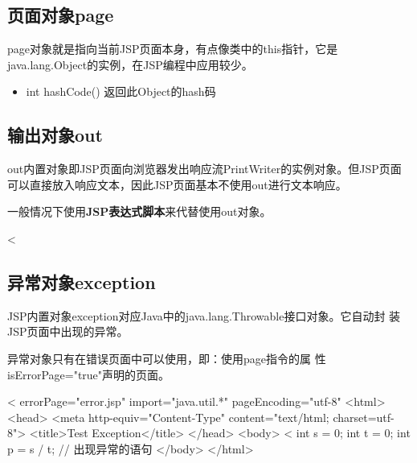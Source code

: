 \subsection{页面对象page} 

page对象就是指向当前JSP页面本身，有点像类中的this指针，它是java.lang.Object的实例，在JSP编程中应用较少。


\begin{itemize}
\item int hashCode() 返回此Object的hash码
\end{itemize}


\subsection{输出对象out}

out内置对象即JSP页面向浏览器发出响应流PrintWriter的实例对象。但JSP页面
可以直接放入响应文本，因此JSP页面基本不使用out进行文本响应。

一般情况下使用{\bf\Red JSP表达式脚本}来代替使用out对象。

\begin{jspCode}
  <%
\end{jspCode}

\subsection{异常对象exception} 

JSP内置对象exception对应Java中的java.lang.Throwable接口对象。它自动封
装JSP页面中出现的异常。

异常对象只有在{\hei\Blue 错误页面}中可以使用，即：{\kai\Red 使用page指令的属
  性{\Blue isErrorPage="true"}声明的页面。}


\begin{jspCode}
  <%
    errorPage="error.jsp" import="java.util.*" pageEncoding="utf-8" %
  <html>
    <head>
      <meta http-equiv="Content-Type" content="text/html; charset=utf-8">
      <title>Test Exception</title>
    </head>
    <body>
      <%
        int s = 0;
        int t = 0; 
        int p = s / t; // 出现异常的语句
    </body>
  </html>  
\end{jspCode}

